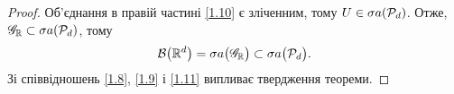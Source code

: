 \begin{proof}
Об'єднання в правій частині \eqref{1.10} є зліченним, тому $U\in \sigma a (\mathcal P_d)$. Отже,  $\mathscr G_{\mathbb R}\subset \sigma a (\mathcal P_d)$, тому 
\begin{equation}
\label{1.11}
\mathcal B\big({\mathbb R}^d\big)=\sigma a \big(\mathscr G_{\mathbb R}\big)\subset \sigma a \big(\mathcal P_d\big).
\end{equation}
Зі співвідношень  \eqref{1.8}, \eqref{1.9} і \eqref{1.11} випливає твердження теореми.	
\end{proof}

